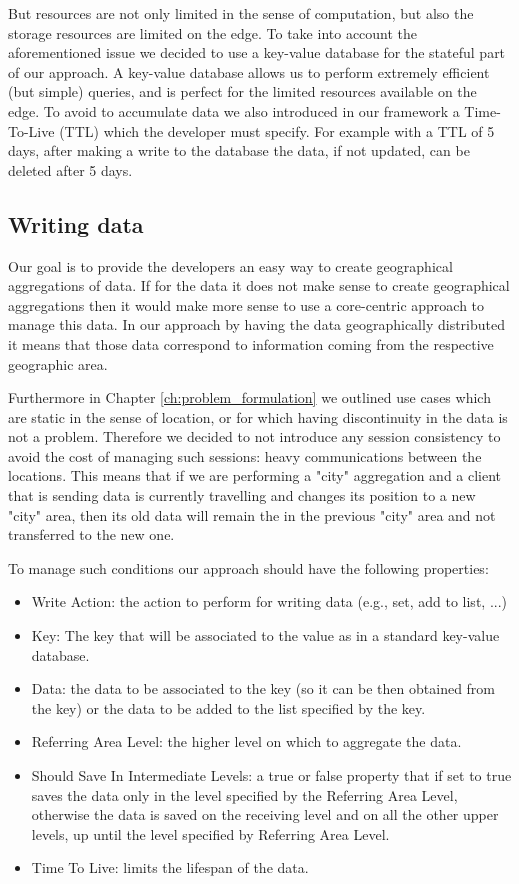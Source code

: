 But resources are not only limited in the sense of computation, but also the storage resources are limited on the edge. To take into account the aforementioned issue we decided to use a key-value database for the stateful part of our approach. A key-value database allows us to perform extremely efficient (but simple) queries, and is perfect for the limited resources available on the edge. To avoid to accumulate data we also introduced in our framework a Time-To-Live (TTL) which the developer must specify. For example with a TTL of 5 days, after making a write to the database the data, if not updated, can be deleted after 5 days.


\subsection{Writing data}
Our goal is to provide the developers an easy way to create geographical aggregations of data. If for the data it does not make sense to create geographical aggregations then it would make more sense to use a core-centric approach to manage this data. In our approach by having the data geographically distributed it means that those data correspond to information coming from the respective geographic area.

Furthermore in Chapter \ref{ch:problem_formulation} we outlined use cases which are static in the sense of location, or for which having discontinuity in the data is not a problem. Therefore we decided to not introduce any session consistency to avoid the cost of managing such sessions: heavy communications between the locations. This means that if we are performing a "city" aggregation and a client that is sending data is currently travelling and changes its position to a new "city" area, then its old data will remain the in the previous "city" area and not transferred to the new one.

To manage such conditions our approach should have the following properties:
\begin{itemize}
    \item Write Action: the action to perform for writing data (e.g., set, add to list, ...)
    \item Key: The key that will be associated to the value as in a standard key-value database.
     \item Data: the data to be associated to the key (so it can be then obtained from the key) or the data to be added to the list specified by the key.
     \item Referring Area Level: the higher level on which to aggregate the data.
     \item Should Save In Intermediate Levels: a true or false property that if set to true saves the data only in the level specified by the Referring Area Level, otherwise the data is saved on the receiving level and on all the other upper levels, up until the level specified by Referring Area Level.
     \item Time To Live: limits the lifespan of the data.
\end{itemize}

